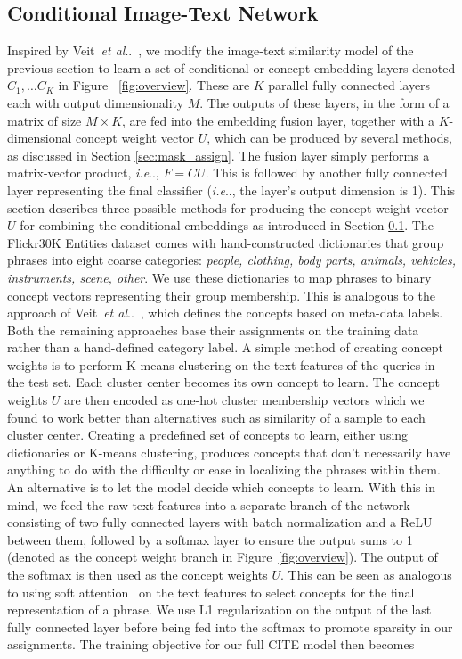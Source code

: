 \documentclass[runningheads]{llncs}
\makeatletter
\DeclareRobustCommand\onedot{\futurelet\@let@token\@onedot}
\def\@onedot{\ifx\@let@token.\else.\null\fi\xspace}
\def\ie{\emph{i.e}\onedot} \def\Ie{\emph{I.e}\onedot}
\def\etal{\emph{et al}\onedot}
\makeatother
\begin{document}
\subsection{Conditional Image-Text Network}\label{sec:cond_im_text}
Inspired by Veit~\etal~\cite{veitCVPR2017}, we modify the image-text similarity model of the previous section to learn a set of conditional or concept embedding layers denoted $C_1, \ldots C_K$ in Figure ~\ref{fig:overview}. These are $K$ parallel fully connected layers each with output dimensionality $M$. The outputs of these layers, in the form of a matrix of size $M \times K$, are fed into the embedding fusion layer, together with a $K$-dimensional concept weight vector $U$, which can be produced by several methods, as discussed in Section \ref{sec:mask_assign}. The fusion layer simply performs a matrix-vector product, \ie, $F = CU$. This is followed by another fully connected layer representing the final classifier (\ie, the layer's output dimension is 1).
This section describes three possible methods for producing the concept weight vector $U$ for combining the conditional embeddings as introduced in Section \ref{sec:cond_im_text}.
\smallskip{}  The Flickr30K Entities dataset comes with hand-constructed dictionaries that group phrases into eight coarse categories: \emph{people, clothing, body parts, animals, vehicles, instruments, scene, other}.  We use these dictionaries to map phrases to binary concept vectors representing their group membership.  This is analogous to the approach of Veit~\etal~\cite{veitCVPR2017}, which defines the concepts based on meta-data labels.  Both the remaining approaches base their assignments on the training data rather than a hand-defined category label.
\smallskip{}  A simple method of creating concept weights is to perform K-means clustering on the text features of the queries in the test set.  Each cluster center becomes its own concept to learn.  The concept weights $U$ are then encoded as one-hot cluster membership vectors which we found to work better than alternatives such as similarity of a sample to each cluster center.
\smallskip{} Creating a predefined set of concepts to learn, either using dictionaries or K-means clustering, produces concepts that don't necessarily have anything to do with the difficulty or ease in localizing the phrases within them.  An alternative is to let the model decide which concepts to learn.  With this in mind, we feed the raw text features into a separate branch of the network consisting of two fully connected layers with batch normalization and a ReLU between them, followed by a softmax layer to ensure the output sums to 1 (denoted as the concept weight branch in Figure~\ref{fig:overview}).  The output of the softmax is then used as the concept weights $U$.  This can be seen as analogous to using soft attention~\cite{xu2015show} on the text features to select concepts for the final representation of a phrase.  We use L1 regularization on the output of the last fully connected layer before being fed into the softmax to promote sparsity in our assignments.  The training objective for our full CITE model then becomes
\end{document}
